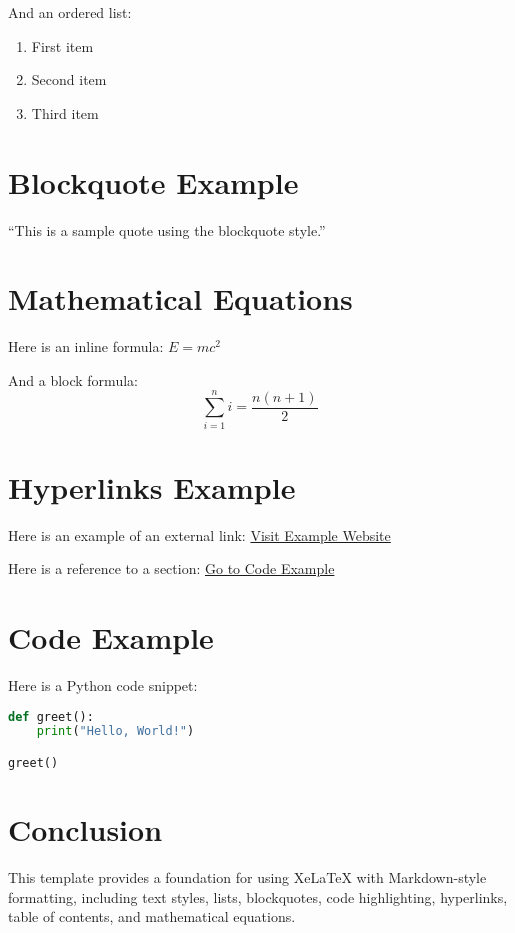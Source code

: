 \documentclass[12pt]{article}
\begin{document}
And an ordered list:
\begin{enumerate}
    \item First item
    \item Second item
    \item Third item
\end{enumerate}

\section{Blockquote Example}
\begin{quotebox}
    ``This is a sample quote using the blockquote style.''
\end{quotebox}

\section{Mathematical Equations}
Here is an inline formula: $E = mc^2$

And a block formula:
\[
    \sum_{i=1}^{n} i = \frac{n(n+1)}{2}
\]

\section{Hyperlinks Example}
Here is an example of an external link: \href{https://www.example.com}{Visit Example Website}

Here is a reference to a section: \hyperref[sec:code]{Go to Code Example}

\section{Code Example}\label{sec:code}
Here is a Python code snippet:
\begin{lstlisting}[language=Python, caption=Python Example]
def greet():
    print("Hello, World!")

greet()
\end{lstlisting}

\section{Conclusion}
This template provides a foundation for using XeLaTeX with Markdown-style formatting, including text styles, lists, blockquotes, code highlighting, hyperlinks, table of contents, and mathematical equations.
\end{document}
